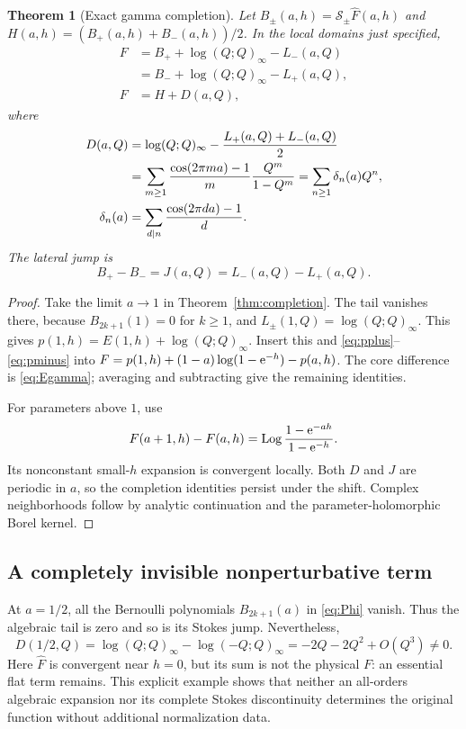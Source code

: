 \documentclass[11pt,a4paper]{article}
\numberwithin{equation}{section}
\newtheorem{theorem}{Theorem}[section]
\theoremstyle{definition}
\theoremstyle{remark}\newtheorem{remark}[theorem]{Remark}
\newcommand{\Log}{\operatorname{Log}}\newcommand{\Li}{\operatorname{Li}}
\begin{document}
\begin{theorem}[Exact gamma completion]\label{thm:gamma-completion}
Let $B_\pm(a,h)=\mathcal S_\pm\widehat F(a,h)$ and
$H(a,h)=(B_+(a,h)+B_-(a,h))/2$. In the local domains just specified,
\begin{align}
 F&=B_++\log(Q;Q)_\infty-L_-(a,Q)\label{eq:gamma-plus}\\
  &=B_-+\log(Q;Q)_\infty-L_+(a,Q),\label{eq:gamma-minus}\\
 F&=H+D(a,Q),\label{eq:gamma-median}
\end{align}
where
\begin{align}
 D(a,Q)&=\log(Q;Q)_\infty-\frac{L_+(a,Q)+L_-(a,Q)}2\notag\\
 &=\sum_{m\ge1}\frac{\cos(2\pi ma)-1}{m}\frac{Q^m}{1-Q^m}
   =\sum_{n\ge1}\delta_n(a)Q^n,\label{eq:D}\\
 \delta_n(a)&=\sum_{d\mid n}\frac{\cos(2\pi da)-1}{d}.
                       \label{eq:delta-n}
\end{align}
The lateral jump is
\begin{equation}\label{eq:gamma-J}
 B_+-B_-=J(a,Q)=L_-(a,Q)-L_+(a,Q).
\end{equation}
\end{theorem}
\begin{proof}
Take the limit $a\to1$ in Theorem~\ref{thm:completion}.
The tail vanishes there, because $B_{2k+1}(1)=0$ for $k\ge1$, and
$L_\pm(1,Q)=\log(Q;Q)_\infty$. This gives
$p(1,h)=E(1,h)+\log(Q;Q)_\infty$.
Insert this and \eqref{eq:pplus}--\eqref{eq:pminus} into
$F=p(1,h)+(1-a)\log(1-\mathrm e^{-h})-p(a,h)$.
The core difference is \eqref{eq:Egamma}; averaging and subtracting
give the remaining identities.

For parameters above $1$, use
\begin{equation}\label{eq:gamma-recurrence}
 F(a+1,h)-F(a,h)=\Log\frac{1-\e^{-ah}}{1-\e^{-h}}.
\end{equation}
Its nonconstant small-$h$ expansion is convergent locally. Both $D$ and
$J$ are periodic in $a$, so the completion identities persist under the
shift. Complex neighborhoods follow by analytic continuation and the
parameter-holomorphic Borel kernel.
\end{proof}

\subsection{A completely invisible nonperturbative term}
At $a=1/2$, all the Bernoulli polynomials $B_{2k+1}(a)$ in
\eqref{eq:Phi} vanish. Thus the algebraic tail is zero and so is its
Stokes jump. Nevertheless,
\begin{equation}\label{eq:half-invisible}
 D(1/2,Q)=\log(Q;Q)_\infty-\log(-Q;Q)_\infty
          =-2Q-2Q^2+O(Q^3)\ne0.
\end{equation}
Here $\widehat F$ is convergent near $h=0$, but its sum is not the
physical $F$: an essential flat term remains. This explicit example
shows that neither an all-orders algebraic expansion nor its complete
Stokes discontinuity determines the original function without additional
normalization data.
\end{document}

